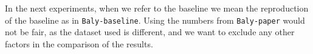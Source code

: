 In the next experiments, when we refer to the baseline
we mean the reproduction of the baseline as in \texttt{Baly-baseline}. Using the numbers from \texttt{Baly-paper} would not be fair, as the dataset used is different, and we want to exclude any other factors in the comparison of the results.

















